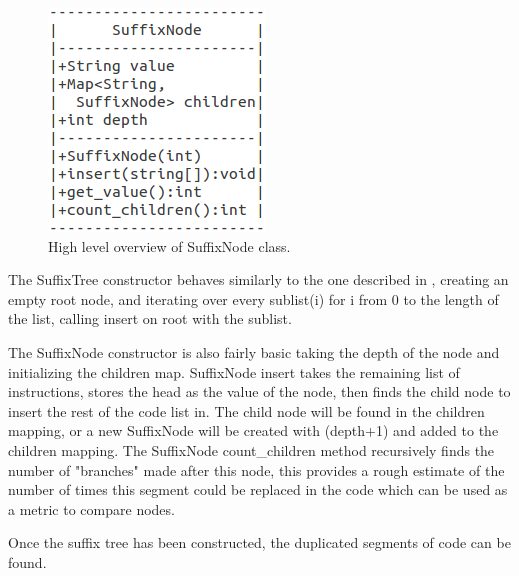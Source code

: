 \documentclass[9pt,nocopyrightspace]{sigplanconf}
\begin{document}
\begin{figure}
\begin{center}
\includegraphics{node}
\caption{High level overview of SuffixNode class.}
\end{center}
\end{figure}

The SuffixTree constructor behaves similarly to the one described in \cite{ctci01}, creating an empty root node, and iterating over every sublist(i) for i from 0 to the length of the list, calling insert on root with the sublist. 

The SuffixNode constructor is also fairly basic taking the depth of the node and initializing the children map.
SuffixNode insert takes the remaining list of instructions, stores the head as the value of the node, then finds the child node to insert the rest of the code list in.
The child node will be found in the children mapping, or a new SuffixNode will be created with (depth+1) and added to the children mapping.
The SuffixNode count\_children method recursively finds the number of "branches" made after this node, this provides a rough estimate of the number of times this segment could be replaced in the code which can be used as a metric to compare nodes.

Once the suffix tree has been constructed, the duplicated segments of code can be found.
\end{document}
